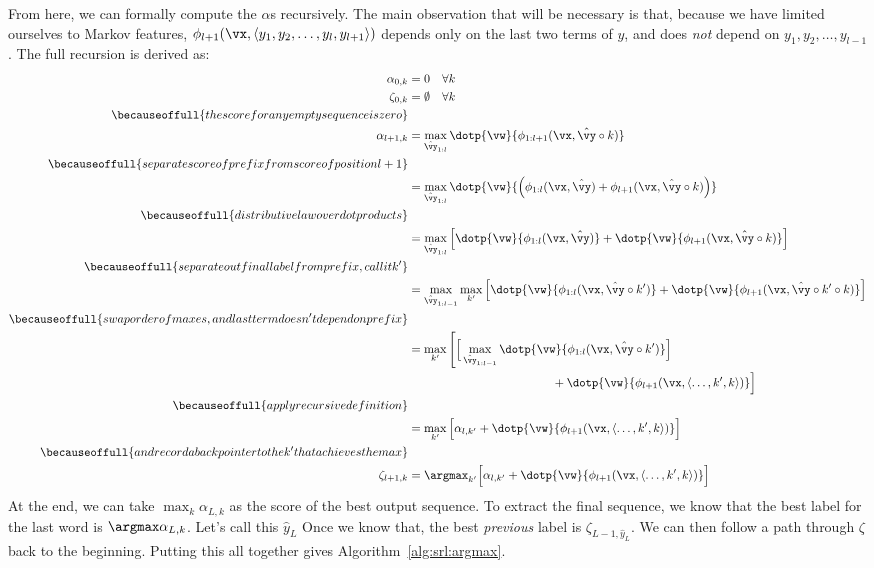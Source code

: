 From here, we can formally compute the $\alpha$s recursively.
The main observation that will be necessary is that, because we have limited ourselves to Markov features, $\phi_{l+1}(\vx, \langle y_1, y_2, \dots, y_l, y_{l+1} \rangle)$ depends only on the last two terms of $y$, and does \emph{not} depend on $y_1, y_2, \dots, y_{l-1}$.
The full recursion is derived as:
\begin{align}
\alpha_{0,k} &= 0 \quad \forall k \\
\zeta_{0,k}  &= \emptyset \quad \forall k \\
  \becauseoffull{the score for any empty sequence is zero} \\
\alpha_{l+1,k} &= \max_{\hat\vy_{1:l}} \dotp{\vw}{\phi_{1:l+1}(\vx, \hat\vy \circ k)} \\
  \becauseoffull{separate score of prefix from score of position l+1} \\
              &= \max_{\hat\vy_{1:l}} \dotp{\vw}{\Big( \phi_{1:l}(\vx, \hat\vy) + \phi_{l+1}(\vx, \hat\vy \circ k)\Big)}  \\
  \becauseoffull{distributive law over dot products} \\
              &= \max_{\hat\vy_{1:l}} \Big[ \dotp{\vw}{\phi_{1:l}(\vx, \hat\vy)}
                                         + \dotp{\vw}{\phi_{l+1}(\vx, \hat\vy \circ k)} \Big] \\
  \becauseoffull{separate out final label from prefix, call it k'} \\
              &= \max_{\hat\vy_{1:l-1}} \max_{k'} \Big[ \dotp{\vw}{\phi_{1:l}(\vx, \hat\vy \circ k')}
                                         + \dotp{\vw}{\phi_{l+1}(\vx, \hat\vy \circ k' \circ k)} \Big] \\
  \becauseoffull{swap order of maxes, and last term doesn't depend on prefix} \\
              &= \max_{k'} \left[ \Big[ \max_{\hat\vy_{1:l-1}} \dotp{\vw}{\phi_{1:l}(\vx, \hat\vy \circ k')} \Big] \right. \nonumber\\
& \qquad\qquad\qquad\qquad\qquad\qquad                    + \dotp{\vw}{\phi_{l+1}(\vx, \langle \dots, k', k \rangle)} \Big]\\
  \becauseoffull{apply recursive definition} \\
              &= \max_{k'} \Big[ \alpha_{l,k'} + \dotp{\vw}{\phi_{l+1}(\vx, \langle \dots, k', k \rangle)} \Big] \label{eq:srl:recursion}  \\
  \becauseoffull{and record a backpointer to the k' that achieves the max} \\
\zeta_{l+1,k}  &= \argmax_{k'} \Big[ \alpha_{l,k'} + \dotp{\vw}{\phi_{l+1}(\vx, \langle \dots, k', k \rangle)} \Big]
\end{align}
At the end, we can take $\max_k \alpha_{L,k}$ as the score of the best output sequence.
To extract the final sequence, we know that the best label for the last word is $\argmax \alpha_{L,k}$.
Let's call this $\hat y_L$
Once we know that, the best \emph{previous} label is $\zeta_{L-1,\hat y_L}$.
We can then follow a path through $\zeta$ back to the beginning.
Putting this all together gives Algorithm~\ref{alg:srl:argmax}.

